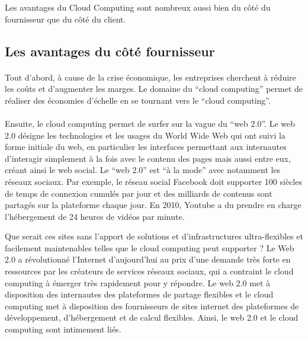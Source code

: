 \documentclass[a4paper,12pt]{report}
\begin{document}
\begin{onehalfspace}
	Les avantages du Cloud Computing sont nombreux aussi bien du côté du fournisseur que du côté du client.
	
	\subsection{Les avantages du côté fournisseur}
	
	\paragraph*{}
	Tout d’abord, à cause de la crise économique, les entreprises cherchent à réduire les coûts et d’augmenter les marges. Le domaine du “cloud computing” permet de réaliser des économies d’échelle en se tournant vers le “cloud computing”.

	\paragraph*{}
	Ensuite, le cloud computing permet de surfer sur la vague du “web 2.0”. Le web 2.0 désigne les technologies et les usages du World Wide Web qui ont suivi la forme initiale du web, en particulier les interfaces permettant aux internautes d'interagir simplement à la fois avec le contenu des pages mais aussi entre eux, créant ainsi le web social. Le “web 2.0” est “à la mode” avec notamment les réseaux sociaux. Par exemple, le réseau social Facebook doit supporter 100 siècles de temps de connexion cumulés par jour et des milliards de contenus sont partagés sur la plateforme chaque jour. En 2010, Youtube a du prendre en charge l’hébergement de 24 heures de vidéos par minute.

	Que serait ces sites sans l’apport de solutions et d’infrastructures ultra-flexibles et facilement maintenables telles que le cloud computing peut supporter ? Le Web 2.0 a révolutionné l’Internet d’aujourd’hui au prix d’une demande très forte en ressources par les créateurs de services réseaux sociaux, qui a contraint le cloud computing à émerger très rapidement pour y répondre. Le web 2.0 met à disposition des internautes des plateformes de partage flexibles et le cloud computing met à disposition des fournisseurs de sites internet des plateformes de développement, d’hébergement et de calcul flexibles. Ainsi, le web 2.0 et le cloud computing sont intimement liés.
	

\end{onehalfspace}
\end{document}
